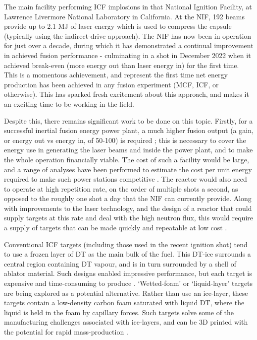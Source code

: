 The main facility performing ICF implosions in that National Ignition Facility, at Lawrence Livermore National Laboratory in California. At the NIF, 192 beams provide up to 2.1 MJ of laser energy which is used to compress the capsule (typically using the indirect-drive approach). The NIF has now been in operation for just over a decade, during which it has demonstrated a continual improvement in achieved fusion performance - culminating in a shot in December 2022 when it achieved break-even (more energy out than laser energy in) for the first time. This is a momentous achievement, and represent the first time net energy production has been achieved in any fusion experiment (MCF, ICF, or otherwise). This has sparked fresh excitement about this approach, and makes it an exciting time to be working in the field.

Despite this, there remains significant work to be done on this topic. Firstly, for a successful inertial fusion energy power plant, a much higher fusion output (a gain, or energy out vs energy in, of 50-100) is required \cite{Campbell2017}; this is necessary to cover the energy use in generating the laser beams and inside the power plant, and to make the whole operation financially viable. The cost of such a facility would be large, and a range of analyses have been performed to estimate the cost per unit energy required to make such power stations competitive \cite{Tynan2020, Gi2020}. The reactor would also need to operate at high repetition rate, on the order of multiple shots a second, as opposed to the roughly one shot a day that the NIF can currently provide. Along with improvements to the laser technology, and the design of a reactor that could supply targets at this rate and deal with the high neutron flux, this would require a supply of targets that can be made quickly and repeatable at low cost \cite{Nuckolls2010}.

Conventional ICF targets (including those used in the recent ignition shot) tend to use a frozen layer of DT as the main bulk of the fuel. This DT-ice surrounds a central region containing DT vapour, and is in turn surrounded by a shell of ablator material. Such designs enabled impressive performance, but each target is expensive and time-consuming to produce \cite{Goncharov2020}. `Wetted-foam' or `liquid-layer' targets are being explored as a potential alternative. Rather than use an ice-layer, these targets contain a low-density carbon foam saturated with liquid DT, where the liquid is held in the foam by capillary forces. Such targets solve some of the manufacturing challenges associated with ice-layers, and can be 3D printed with the potential for rapid mass-production \cite{Olson2021}.

